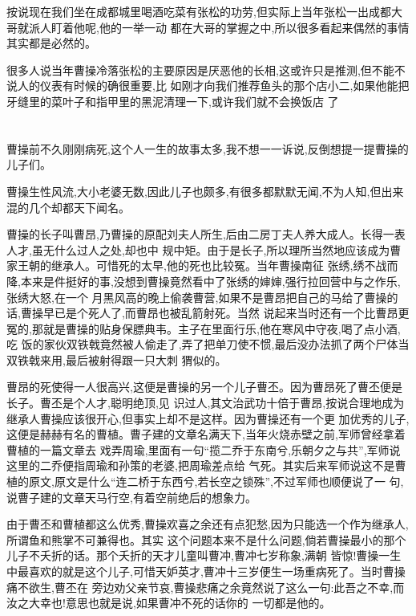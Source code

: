 ﻿\documentclass[12pt,twocolumn]{article}
\begin{document}
按说现在我们坐在成都城里喝酒吃菜有张松的功劳,但实际上当年张松一出成都大哥就派人盯着他呢,他的一举一动
都在大哥的掌握之中,所以很多看起来偶然的事情其实都是必然的。

很多人说当年曹操冷落张松的主要原因是厌恶他的长相,这或许只是推测,但不能不说人的仪表有时候的确很重要,比
如刚才向我们推荐鱼头的那个店小二,如果他能把牙缝里的菜叶子和指甲里的黑泥清理一下,或许我们就不会换饭店
了

\section{}

曹操前不久刚刚病死,这个人一生的故事太多,我不想一一诉说,反倒想提一提曹操的儿子们。

曹操生性风流,大小老婆无数,因此儿子也颇多,有很多都默默无闻,不为人知,但出来混的几个却都天下闻名。

曹操的长子叫曹昂,乃曹操的原配刘夫人所生,后由二房丁夫人养大成人。长得一表人才,虽无什么过人之处,却也中
规中矩。由于是长子,所以理所当然地应该成为曹家王朝的继承人。可惜死的太早,他的死也比较冤。当年曹操南征
张绣,绣不战而降,本来是件挺好的事,没想到曹操竟然看中了张绣的婶婶,强行拉回营中与之作乐,张绣大怒,在一个
月黑风高的晚上偷袭曹营,如果不是曹昂把自己的马给了曹操的话,曹操早已是个死人了,而曹昂也被乱箭射死。当然
说起来当时还有一个比曹昂更冤的,那就是曹操的贴身保膘典韦。主子在里面行乐,他在寒风中守夜,喝了点小酒,吃
饭的家伙双铁戟竟然被人偷走了,弄了把单刀使不惯,最后没办法抓了两个尸体当双铁戟来用,最后被射得跟一只大刺
猬似的。

曹昂的死使得一人很高兴,这便是曹操的另一个儿子曹丕。因为曹昂死了曹丕便是长子。曹丕是个人才,聪明绝顶,见
识过人,其文治武功十倍于曹昂,按说合理地成为继承人曹操应该很开心,但事实上却不是这样。因为曹操还有一个更
加优秀的儿子,这便是赫赫有名的曹植。曹子建的文章名满天下,当年火烧赤壁之前,军师曾经拿着曹植的一篇文章去
戏弄周瑜,里面有一句``揽二乔于东南兮,乐朝夕之与共'',军师说这里的二乔便指周瑜和孙策的老婆,把周瑜差点给
气死。其实后来军师说这不是曹植的原文,原文是什么``连二桥于东西兮,若长空之锁殊'',不过军师也顺便说了一
句,说曹子建的文章天马行空,有着空前绝后的想象力。

由于曹丕和曹植都这么优秀,曹操欢喜之余还有点犯愁,因为只能选一个作为继承人,所谓鱼和熊掌不可兼得也。其实
这个问题本来不是什么问题,倘若曹操最小的那个儿子不夭折的话。那个夭折的天才儿童叫曹冲,曹冲七岁称象,满朝
皆惊!曹操一生中最喜欢的就是这个儿子,可惜天妒英才,曹冲十三岁便生一场重病死了。当时曹操痛不欲生,曹丕在
旁边劝父亲节哀,曹操悲痛之余竟然说了这么一句:此吾之不幸,而汝之大幸也!意思也就是说,如果曹冲不死的话你的
一切都是他的。
\end{document}
